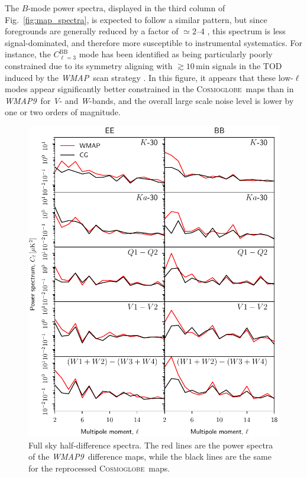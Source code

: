 \documentclass[twocolumn]{../../common/aa}
\def\WMAP{\emph{WMAP}}
\def\WMAPnine{\emph{WMAP9}}
\newcommand{\cosmoglobe}{\textsc{Cosmoglobe}}
\newcommand{\V}[0]{\textit V}
\newcommand{\W}[0]{\textit W}
\begin{document}
The $B$-mode power spectra, displayed in the third column of Fig.~\ref{fig:map_spectra}, is expected to follow a similar pattern, but since foregrounds are generally reduced by a factor of $\simeq2$--4 \citep{bennett2012,planck2016-l04}, this spectrum is less signal-dominated, and therefore more susceptible to instrumental systematics. For instance, the $C_{\ell=3}^\mathrm{BB}$ mode has been identified as being particularly poorly constrained due to its symmetry aligning with $\gtrsim10\,\mathrm{min}$ signals in the TOD induced by the \WMAP\ scan strategy \citep[e.g.,][]{jarosik2010}. In this figure, it appears that these low-$\ell$ modes appear significantly better constrained in the \cosmoglobe\ maps than in \WMAPnine\ for \V- and \W-bands, and the overall large scale noise level is lower by one or two orders of magnitude. 

\begin{figure}
	\centering
	\includegraphics[width=\linewidth]{figures/cls_cg_WMAP_lowl.pdf}
	\caption{Full sky half-difference spectra. The red lines are the power spectra of the \WMAPnine\ difference maps, while the black lines are the same for the reprocessed \cosmoglobe\ maps.}
        \label{fig:cl_halfdiff}
\end{figure}
\end{document}
